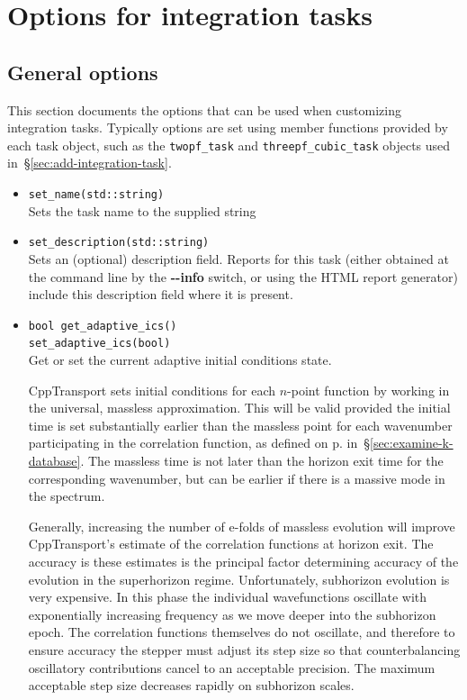 \documentclass[11pt,a4paper]{article}
\newcommand{\packagefont}{\sffamily}
\newcommand{\CppTransport}{{\packagefont CppTransport}}
\newcommand{\option}[1]{{\ttfamily\bfseries\small #1}}
\begin{document}
\section{Options for integration tasks}
\label{sec:int-options}

\subsection{General options}
\label{sec:general-integration-options}
This section documents the options that can be used when customizing
integration tasks.
Typically options are set using member functions provided by
each task object, such as
the \texttt{twopf_task} and \texttt{threepf_cubic_task}
objects used in~\S\ref{sec:add-integration-task}.

\begin{itemize}
    \item \texttt{set_name(std::string)} \\
    Sets the task name to the supplied string
    
    \item \texttt{set_description(std::string)} \\
    Sets an (optional) description field. Reports
    for this task (either obtained
    at the command line by the \option{{-}{-}info} switch, or using the
    HTML report generator) include this description field where it is
    present.
    
    \item
    \label{enum:adpative-ics}
    \texttt{bool get_adaptive_ics()} \\
    \texttt{set_adaptive_ics(bool)} \\
    Get or set the current adaptive initial conditions state.
    
    {\CppTransport} sets initial conditions for each $n$-point function
    by working in the universal, massless approximation.
    This will be valid provided the initial time is set substantially earlier
    than the massless point for each wavenumber
    participating in the correlation function,
    as defined on p.\pageref{enum:massless-time}
    in~\S\ref{sec:examine-k-database}.
    The massless time is not later than the horizon exit time for the corresponding
    wavenumber, but can be earlier if there is a massive mode in the spectrum.

    Generally, increasing the number of e-folds of massless evolution
    will improve {\CppTransport}'s estimate of the correlation functions
    at horizon exit.
    The accuracy is these estimates is the principal factor determining accuracy
    of the evolution in the superhorizon regime.
    Unfortunately, subhorizon evolution is very expensive.
    In this phase the individual wavefunctions oscillate with exponentially
    increasing frequency
    as we move deeper into the subhorizon epoch.
    The correlation functions themselves do not oscillate,
    and therefore to ensure accuracy the stepper must adjust its
    step size so that counterbalancing oscillatory contributions cancel
    to an acceptable precision.
    The maximum acceptable step size decreases rapidly on subhorizon
    scales.
    

\end{itemize}
\end{document}
